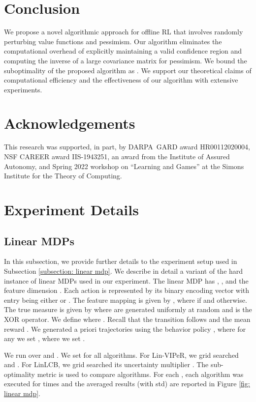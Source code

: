 \documentclass{article} \usepackage{iclr2023/iclr2023_conference,times}
\begin{document}
%
 \section{Conclusion}
We propose a novel algorithmic approach for offline RL that involves randomly perturbing value functions and pessimism. Our algorithm eliminates the computational overhead of explicitly maintaining a valid confidence region and computing the inverse of a large covariance matrix for pessimism. We bound the suboptimality of the proposed algorithm as . We support our theoretical claims of computational efficiency and the effectiveness of our algorithm with extensive experiments. 






\section*{Acknowledgements}
This research was supported, in part, by  DARPA~GARD award HR00112020004, NSF CAREER award IIS-1943251, an award from the Institute of Assured Autonomy, and Spring 2022 workshop on ``Learning and Games'' at the Simons Institute for the Theory of Computing. 

\newpage
\appendix
\section{Experiment Details}
\subsection{Linear MDPs}
\label{subsection: description of linear mdp}
In this subsection, we provide further details to the experiment setup used in Subsection \ref{subsection: linear mdp}. We describe in detail a variant of the hard instance of linear MDPs \citep{yinnear} used in our experiment. The linear MDP has , , and the feature dimension . Each action  is represented by its binary encoding vector  with entry being either  or . The feature mapping  is given by , where  if  and  otherwise. The true measure  is given by   where  are generated uniformly at random and  is the XOR operator. We define  where . Recall that the transition follows  and the mean reward . We generated a priori  trajectories using the behavior policy , where for any  we set , where we set .

We run over  and . We set  for all algorithms. For Lin-VIPeR, we grid searched  and . For LinLCB, we grid searched its uncertainty multiplier . The sub-optimality metric is used to compare algorithms. For each , each algorithm was executed for  times and the averaged results (with std) are reported in Figure \ref{fig: linear mdp}. 
\end{document}

